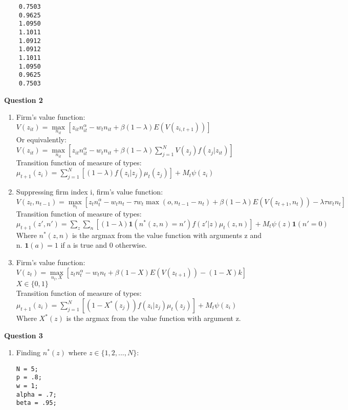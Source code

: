 \documentclass[12pt]{article}
\begin{document}
\begin{onehalfspace}
\begin{enumerate}[1.]
\begin{lstlisting}
    0.7503
    0.9625
    1.0950
    1.1011
    1.0912
    1.0912
    1.1011
    1.0950
    0.9625
    0.7503
    \end{lstlisting}
    \end{enumerate}

\textbf{Question 2}
\begin{enumerate}[1.]
    \item 
    Firm's value function:\\
    $V(z_{it}) = \max\limits_{n_{it}}\left[z_{it}n_{it}^\alpha -w_tn_{it} + \beta(1-\lambda) E(V(z_{i,t+1}))\right]$\\
    Or equivalently:\\
    $V(z_{it}) = \max\limits_{n_{it}}\left[z_{it}n_{it}^\alpha -w_tn_{it} + \beta(1-\lambda) \sum\limits_{j=1}^{N}V(z_j)f(z_j|z_{it})\right]$\\
    Transition function of measure of types:\\
    $\mu_{t+1}(z_i) = \sum\limits_{j=1}^{N}\left[(1-\lambda)f(z_i|z_j)\mu_t(z_j)\right] + M_t\psi(z_i)$
    \item
    Suppressing firm index i, firm's value function:\\
    $V(z_t, n_{t-1}) = \max\limits_{n_t}\left[z_tn_t^\alpha -w_tn_t -\tau w_t \max(o, n_{t-1}-n_t) + \beta(1-\lambda) E(V(z_{t+1},n_t)) -\lambda \tau w_t n_t\right]$\\
    Transition function of measure of types:\\
    $\mu_{t+1}(z', n') = \sum\limits_{z}\sum\limits_{n}\left[(1-\lambda)\textbf{1}(n^*(z, n) = n')f(z'|z)\mu_t(z,n)\right] + M_t\psi(z)\textbf{1}(n'=0)$\\
    Where $n^*(z,n)$ is the argmax from the value function with arguments z and n. $\textbf{1}(a) = 1$ if a is true and $0$ otherwise. 
    \item
    Firm's value function:\\
    $V(z_t) = \max\limits_{n_t, X}\left[z_t n_t^\alpha -w_t n_t + \beta(1-X) E(V(z_{t+1})) - (1-X)k\right]$\\
    $X \in \{0,1\}$\\
    Transition function of measure of types:\\
    $\mu_{t+1}(z_i) = \sum\limits_{j=1}^{N}\left[(1-X^*(z_j))f(z_i|z_j)\mu_t(z_j)\right] + M_t\psi(z_i)$\\
    Where $X^*(z)$ is the argmax from the value function with argument z.
\end{enumerate}

\textbf{Question 3}
\begin{enumerate}[1.]
    \item 
    Finding $n^*(z)$ where $z \in \{1,2,...,N\}$:
    \begin{lstlisting}
N = 5;
p = .8;
w = 1;
alpha = .7;
beta = .95;


\end{lstlisting}
\end{enumerate}
\end{onehalfspace}
\end{document}
